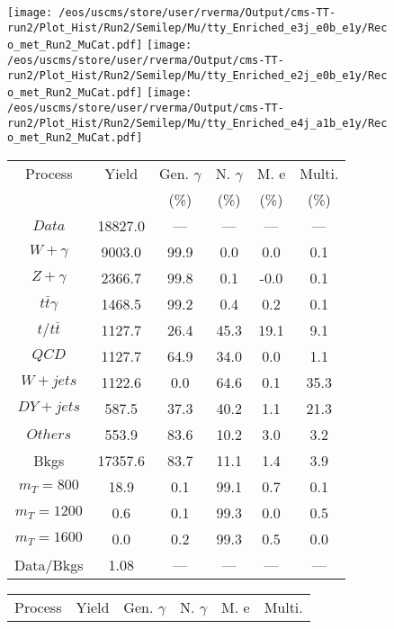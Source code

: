 \begin{figure}
\centering
\texttt{[image: /eos/uscms/store/user/rverma/Output/cms-TT-run2/Plot\_Hist/Run2/Semilep/Mu/tty\_Enriched\_e3j\_e0b\_e1y/Reco\_met\_Run2\_MuCat.pdf]}
\texttt{[image: /eos/uscms/store/user/rverma/Output/cms-TT-run2/Plot\_Hist/Run2/Semilep/Mu/tty\_Enriched\_e2j\_e0b\_e1y/Reco\_met\_Run2\_MuCat.pdf]}
\texttt{[image: /eos/uscms/store/user/rverma/Output/cms-TT-run2/Plot\_Hist/Run2/Semilep/Mu/tty\_Enriched\_e4j\_a1b\_e1y/Reco\_met\_Run2\_MuCat.pdf]}
\begin{minipage}[c]{0.32\textwidth}
\centering
\tiny{
\begin{tabular}{cccccc}
\hline
Process & Yield & Gen. $\gamma$ & N. $\gamma$ & M. e & Multi. \\
 &  & (\%) & (\%) & (\%) & (\%)  \\
\hline
                                                                      $ Data $ &  18827.0 &  --- &  --- &  --- &  ---\\
$ W+\gamma $ &  9003.0 &  99.9 &  0.0 &  0.0 &  0.1\\
$ Z+\gamma $ &  2366.7 &  99.8 &  0.1 &  -0.0 &  0.1\\
$ t\bar{t}\gamma $ &  1468.5 &  99.2 &  0.4 &  0.2 &  0.1\\
$ t/t\bar{t} $ &  1127.7 &  26.4 &  45.3 &  19.1 &  9.1\\
$ QCD $ &  1127.7 &  64.9 &  34.0 &  0.0 &  1.1\\
$ W+jets $ &  1122.6 &  0.0 &  64.6 &  0.1 &  35.3\\
$ DY+jets $ &  587.5 &  37.3 &  40.2 &  1.1 &  21.3\\
$ Others $ &  553.9 &  83.6 &  10.2 &  3.0 &  3.2\\
Bkgs &  17357.6 &  83.7 &  11.1 &  1.4 &  3.9\\
$ m_{T} = 800 $ &  18.9 &  0.1 &  99.1 &  0.7 &  0.1\\
$ m_{T} = 1200 $ &  0.6 &  0.1 &  99.3 &  0.0 &  0.5\\
$ m_{T} = 1600 $ &  0.0 &  0.2 &  99.3 &  0.5 &  0.0\\
Data/Bkgs &  1.08 &  --- &  --- &  --- &  ---\\
\hline
\end{tabular}
}
\end{minipage}
\begin{minipage}[c]{0.32\textwidth}
\centering
\tiny{
\begin{tabular}{cccccc}
\hline
Process & Yield & Gen. $\gamma$ & N. $\gamma$ & M. e & Multi. \\

\end{tabular}}
\end{minipage}
\end{figure}
